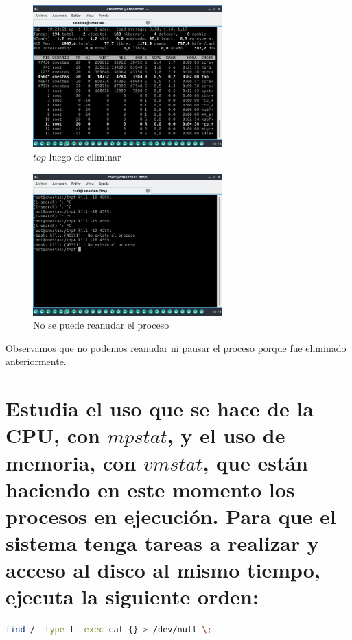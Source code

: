 \documentclass[12pt]{article}
\begin{document}
\clearpage
\newpage

\begin{figure}[h]
    \centering
    \includegraphics[width=0.65\textwidth]{images/screenA35.jpg}
    \caption{$top$ luego de eliminar}
\end{figure}

\begin{figure}[h]
    \centering
    \includegraphics[width=0.65\textwidth]{images/screenA36.jpg}
    \caption{No se puede reanudar el proceso}
\end{figure}

Observamos que no podemos reanudar ni pausar el proceso porque fue eliminado anteriormente.

\clearpage
\newpage

\section{Estudia el uso que se hace de la CPU, con $mpstat$, y el uso de memoria, con
$vmstat$, que están haciendo en este momento los procesos en ejecución. Para que
el sistema tenga tareas a realizar y acceso al disco al mismo tiempo, ejecuta la
siguiente orden:}

\begin{lstlisting}[language=bash,frame=single,style=CStyle]
find / -type f -exec cat {} > /dev/null \;
\end{lstlisting}
\end{document}
